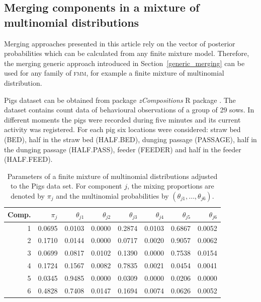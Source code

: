 \documentclass[submit]{smj}
\theoremstyle{definition}
\newcommand{\fmm}{\textsc{fmm}\xspace}
\begin{document}
\subsection{Merging components in a mixture of multinomial distributions}\label{multinom_example}

Merging approaches presented in this article rely on the vector of posterior probabilities which can be calculated from any finite mixture model. Therefore, the merging generic approach introduced in Section~\ref{generic_merging} can be used for any family of \fmm, for example a finite mixture of multinomial distribution.

Pigs dataset can be obtained from package \emph{zCompositions} R package \citep{palarea2015zcompositions}. The dataset contains count data of behavioural observations of a group of 29 sows. In different moments the pigs were recorded during five minutes and its current activity was registered. For each pig six locations were considered: straw bed (BED), half in the straw bed (HALF.BED), dunging passage (PASSAGE), half in the dunging passage (HALF.PASS), feeder (FEEDER) and half in the feeder (HALF.FEED).


\begin{table}[t]
\centering
\begin{tabular}{rrrrrrrr}
  \hline
 Comp.& $\pi_j$ & $\theta_{j1}$ & $\theta_{j2}$ & $\theta_{j3}$ & $\theta_{j4}$ & $\theta_{j5}$ & $\theta_{j6}$ \\ 
  \hline
  1 & 0.0695 & 0.0103 & 0.0000 & 0.2874 & 0.0103 & 0.6867 & 0.0052 \\ 
  2 & 0.1710 & 0.0144 & 0.0000 & 0.0717 & 0.0020 & 0.9057 & 0.0062 \\ 
  3 & 0.0699 & 0.0817 & 0.0102 & 0.1390 & 0.0000 & 0.7538 & 0.0154 \\ 
  4 & 0.1724 & 0.1567 & 0.0082 & 0.7835 & 0.0021 & 0.0454 & 0.0041 \\ 
  5 & 0.0345 & 0.9485 & 0.0000 & 0.0309 & 0.0000 & 0.0206 & 0.0000 \\ 
  6 & 0.4828 & 0.7408 & 0.0147 & 0.1694 & 0.0074 & 0.0626 & 0.0052 \\  
   \hline
\end{tabular}
\caption{Parameters of a finite mixture of multinomial distributions adjusted to the Pigs data set. For component $j$, the mixing proportions are denoted by $\pi_j$ and the multinomial probabilities by $\left(\theta_{j1}, \dots, \theta_{j6}\right)$.}\label{multinomial_pars}
\end{table}
\end{document}
